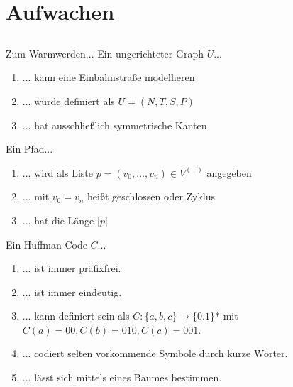 
\section[Einstieg]{Aufwachen}
\subsection*{}
\begin{frame}{Zum Warmwerden...}
  Ein ungerichteter Graph $U$...
    \begin{enumerate}
    \item { 
    ... kann eine Einbahnstraße modellieren
    }
    \item { 
    ... wurde definiert als $U=(N,T,S,P)$
    }
    \item { 
    ... hat ausschließlich symmetrische Kanten
    }
    \end{enumerate}

  Ein Pfad...
    \begin{enumerate}
    \item { 
    ... wird als Liste $p=(v_0,\ldots ,v_n)\in V^{(+)}$ angegeben
    }
    \item { 
    ... mit $v_0=v_n$ heißt geschlossen oder Zyklus
    }
    \item { 
    ... hat die Länge $|p|$
    }
    \end{enumerate}

  Ein Huffman Code $C$...
    \begin{enumerate}
    \item { 
    ... ist immer präfixfrei.
    }
    \item { 
    ... ist immer eindeutig.
    }
    \item { 
    ... kann definiert sein als $C: \{a,b,c\} \rightarrow \{0.1\}$* mit $C(a)=00, C(b)=010, C(c)=001$.
    }
    \item { 
    ... codiert selten vorkommende Symbole durch kurze Wörter.
    }
    \item { 
    ... lässt sich mittels eines Baumes bestimmen.
    }
    \end{enumerate}
\end{frame}
